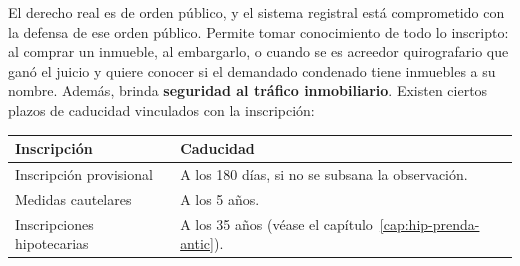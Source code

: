 \documentclass[12pt,oneside]{book}
\begin{document}
El derecho real es de orden público, y el sistema registral está comprometido con la defensa de ese orden público. Permite tomar conocimiento de todo lo inscripto: al comprar un inmueble, al embargarlo, o cuando se es acreedor quirografario que ganó el juicio y quiere conocer si el demandado condenado tiene inmuebles a su nombre. Además, brinda \textbf{seguridad al tráfico inmobiliario}. Existen ciertos plazos de caducidad vinculados con la inscripción:

\begin{table}[H]
\centering
\begin{tabularx}{\textwidth}{@{}>{\raggedright\arraybackslash}p{}>{\raggedright\arraybackslash}X@{}}
\toprule
\textbf{Inscripción} & \textbf{Caducidad} \\
\midrule
Inscripción provisional & A los 180 días, si no se subsana la observación. \\
Medidas cautelares & A los 5 años. \\
Inscripciones hipotecarias & A los 35 años (véase el capítulo~\ref{cap:hip-prenda-antic}). \\
\bottomrule
\end{tabularx}
\end{table}
\end{document}
